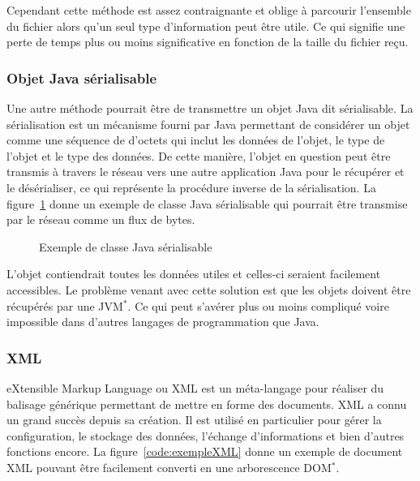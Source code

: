 Cependant cette m\'ethode est assez contraignante et oblige \`a parcourir l'ensemble du fichier alors qu'un seul type d'information peut \^etre utile.
Ce qui signifie une perte de temps plus ou moins significative en fonction de la taille du fichier re\c{c}u.

\subsubsection{Objet Java s\'erialisable}

Une autre m\'ethode pourrait \^etre de transmettre un objet Java dit s\'erialisable.
La s\'erialisation est un m\'ecanisme fourni par Java permettant de consid\'erer un objet comme une s\'equence de d'octets qui inclut les donn\'ees de l'objet, le type de l'objet et le type des donn\'ees.
De cette mani\`ere, l'objet en question peut \^etre transmis \`a travers le r\'eseau vers une autre application Java pour le r\'ecup\'erer et le d\'es\'erialiser, ce qui repr\'esente la proc\'edure inverse de la s\'erialisation.
La figure~\ref{code:exempleJava} donne un exemple de classe Java s\'erialisable qui pourrait \^etre transmise par le r\'eseau comme un flux de bytes.

\vspace{0.20cm}

\begin{figure}[!ht]
	
	\caption{Exemple de classe Java s\'erialisable}
	\label{code:exempleJava}

\end{figure}

L'objet contiendrait toutes les donn\'ees utiles et celles-ci seraient facilement accessibles.
Le probl\`eme venant avec cette solution est que les objets doivent \^etre r\'ecup\'er\'es par une JVM$^*$.
Ce qui peut s'av\'erer plus ou moins compliqu\'e voire impossible dans d'autres langages de programmation que Java.

\subsubsection{XML}

eXtensible Markup Language ou XML est un m\'eta-langage pour r\'ealiser du balisage g\'en\'erique permettant de mettre en forme des documents. XML a connu un grand succ\`es depuis sa cr\'eation.
Il est utilis\'e en particulier pour g\'erer la configuration, le stockage des donn\'ees, l'\'echange d'informations et bien d'autres fonctions encore.
La figure~\ref{code:exempleXML} donne un exemple de document XML pouvant \^etre facilement converti en une arborescence DOM$^*$.

